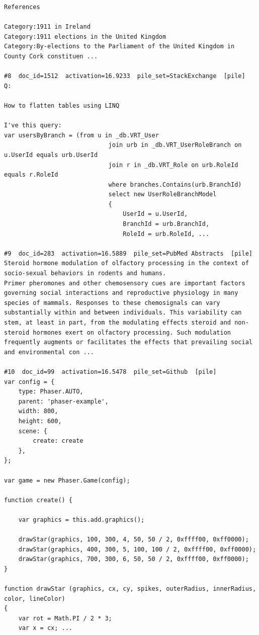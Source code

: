 \begin{verbatim}
References

Category:1911 in Ireland
Category:1911 elections in the United Kingdom
Category:By-elections to the Parliament of the United Kingdom in County Cork constituen ...

#8  doc_id=1512  activation=16.9233  pile_set=StackExchange  [pile]
Q:

How to flatten tables using LINQ

I've this query:
var usersByBranch = (from u in _db.VRT_User
                             join urb in _db.VRT_UserRoleBranch on u.UserId equals urb.UserId
                             join r in _db.VRT_Role on urb.RoleId equals r.RoleId
                             where branches.Contains(urb.BranchId)
                             select new UserRoleBranchModel
                             {
                                 UserId = u.UserId,
                                 BranchId = urb.BranchId,
                                 RoleId = urb.RoleId, ...

#9  doc_id=283  activation=16.5889  pile_set=PubMed Abstracts  [pile]
Steroid hormone modulation of olfactory processing in the context of socio-sexual behaviors in rodents and humans.
Primer pheromones and other chemosensory cues are important factors governing social interactions and reproductive physiology in many species of mammals. Responses to these chemosignals can vary substantially within and between individuals. This variability can stem, at least in part, from the modulating effects steroid and non-steroid hormones exert on olfactory processing. Such modulation frequently augments or facilitates the effects that prevailing social and environmental con ...

#10  doc_id=99  activation=16.5478  pile_set=Github  [pile]
var config = {
    type: Phaser.AUTO,
    parent: 'phaser-example',
    width: 800,
    height: 600,
    scene: {
        create: create
    },
};

var game = new Phaser.Game(config);

function create() {

    var graphics = this.add.graphics();

    drawStar(graphics, 100, 300, 4, 50, 50 / 2, 0xffff00, 0xff0000);
    drawStar(graphics, 400, 300, 5, 100, 100 / 2, 0xffff00, 0xff0000);
    drawStar(graphics, 700, 300, 6, 50, 50 / 2, 0xffff00, 0xff0000);
}

function drawStar (graphics, cx, cy, spikes, outerRadius, innerRadius, color, lineColor)
{
    var rot = Math.PI / 2 * 3;
    var x = cx; ...

\end{verbatim}

